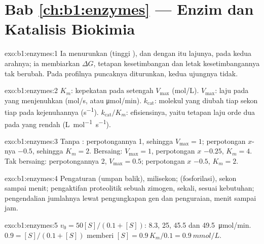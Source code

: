 \section*{Bab \ref{ch:b1:enzymes} --- Enzim dan Katalisis Biokimia}

\begin{solution}{exo:b1:enzymes:1}
Ia menurunkan  (tinggi ), dan
dengan itu lajunya, pada kedua arahnya; ia membiarkan $\Delta G$,
tetapan kesetimbangan dan letak kesetimbangannya tak berubah. Pada
profilnya puncaknya diturunkan, kedua ujungnya tidak.
\end{solution}

\begin{solution}{exo:b1:enzymes:2}
$K_m$: kepekatan  pada setengah $V_{\max}$ (\unit{mol/L}).
$V_{\max}$: laju pada  yang menjenuhkan (\unit{mol/s}, atau
\unit{\micro mol/min}). $k_{\text{cat}}$: molekul  yang diubah
tiap sekon tiap  pada kejenuhannya (\unit{s^{-1}}).
$k_{\text{cat}}/K_m$: efisiensinya, yaitu tetapan laju orde dua pada
 yang rendah
(\unit{L.mol^{-1}.s^{-1}}).
\end{solution}

\begin{solution}{exo:b1:enzymes:3}
Tanpa : perpotongannya 1, sehingga $V_{\max} = 1$;
perpotongan $x$-nya $-0.5$, sehingga $K_m = 2$. Bersaing:
$V_{\max} = 1$, perpotongan $x$ $-0.25$, $K_m = 4$. Tak bersaing:
perpotongannya 2, $V_{\max} = 0.5$; perpotongan $x$ $-0.5$,
$K_m = 2$.
\end{solution}

\begin{solution}{exo:b1:enzymes:4}
Pengaturan  (umpan balik), milisekon; 
(fosforilasi), sekon sampai menit; pengaktifan proteolitik sebuah
zimogen, sekali, sesuai kebutuhan; pengendalian jumlahnya lewat
pengungkapan gen dan penguraian, menit sampai jam.
\end{solution}

\begin{solution}{exo:b1:enzymes:5}
$v_0 = 50[S]/(0.1 + [S])$: 8.3, 25, 45.5 dan \qty{49.5}{\micro mol/min}.
$0.9 = [S]/(0.1 + [S])$ memberi $[S] = 0.9\,K_m/0.1 = \qty{0.9}{mmol/L}$.
\end{solution}

